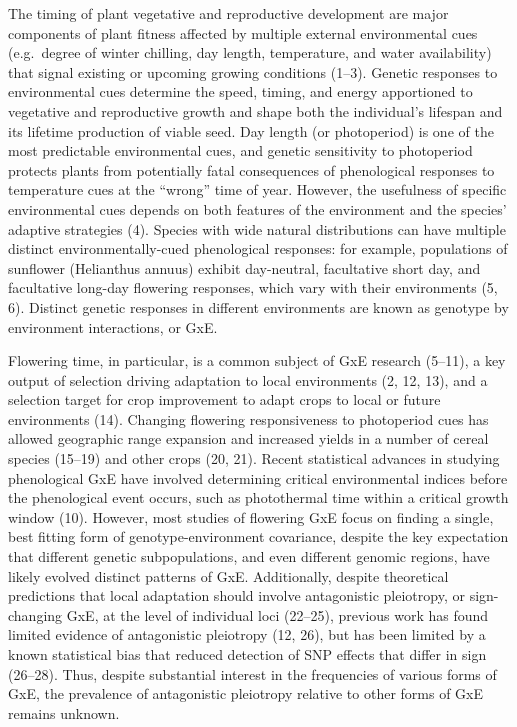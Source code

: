 \documentclass[
  9pt,
  twocolumn,
  twoside]{pnas-new}
\begin{document}
The timing of plant vegetative and reproductive development are major
components of plant fitness affected by multiple external environmental
cues (e.g.~degree of winter chilling, day length, temperature, and water
availability) that signal existing or upcoming growing conditions
(1--3). Genetic responses to environmental cues determine the speed,
timing, and energy apportioned to vegetative and reproductive growth and
shape both the individual's lifespan and its lifetime production of
viable seed. Day length (or photoperiod) is one of the most predictable
environmental cues, and genetic sensitivity to photoperiod protects
plants from potentially fatal consequences of phenological responses to
temperature cues at the ``wrong'' time of year. However, the usefulness
of specific environmental cues depends on both features of the
environment and the species' adaptive strategies (4). Species with wide
natural distributions can have multiple distinct environmentally-cued
phenological responses: for example, populations of sunflower
(Helianthus annuus) exhibit day-neutral, facultative short day, and
facultative long-day flowering responses, which vary with their
environments (5, 6). Distinct genetic responses in different
environments are known as genotype by environment interactions, or GxE.

Flowering time, in particular, is a common subject of GxE research
(5--11), a key output of selection driving adaptation to local
environments (2, 12, 13), and a selection target for crop improvement to
adapt crops to local or future environments (14). Changing flowering
responsiveness to photoperiod cues has allowed geographic range
expansion and increased yields in a number of cereal species (15--19)
and other crops (20, 21). Recent statistical advances in studying
phenological GxE have involved determining critical environmental
indices before the phenological event occurs, such as photothermal time
within a critical growth window (10). However, most studies of flowering
GxE focus on finding a single, best fitting form of genotype-environment
covariance, despite the key expectation that different genetic
subpopulations, and even different genomic regions, have likely evolved
distinct patterns of GxE. Additionally, despite theoretical predictions
that local adaptation should involve antagonistic pleiotropy, or
sign-changing GxE, at the level of individual loci (22--25), previous
work has found limited evidence of antagonistic pleiotropy (12, 26), but
has been limited by a known statistical bias that reduced detection of
SNP effects that differ in sign (26--28). Thus, despite substantial
interest in the frequencies of various forms of GxE, the prevalence of
antagonistic pleiotropy relative to other forms of GxE remains unknown.
\end{document}
